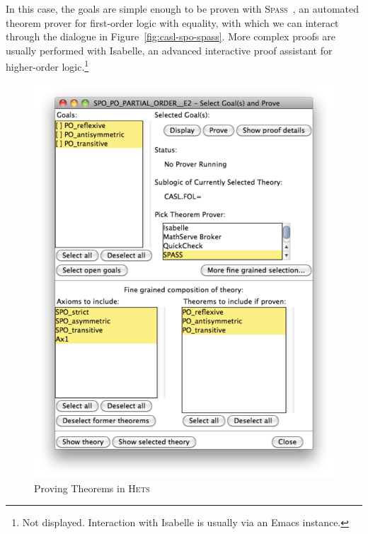 \documentclass[11pt]{article}
\newcommand{\Hets}{\textsc{Hets}}
\newcommand{\Spass}{\textsc{Spass}}
\begin{document}
In this case, the goals are simple enough to be proven with \Spass{}~\cite{Weidenbach:2009}, an automated theorem prover for first-order logic with equality, with which we can interact through the dialogue in Figure~\ref{fig:casl-spo-spass}. More complex proofs are usually performed with Isabelle\cite{Nipkow:2002}, an advanced interactive proof assistant for higher-order logic.\footnote{Not displayed. Interaction with Isabelle is usually via an Emacs instance.}

\begin{figure}
  \begin{minipage}[b]{0.5\textwidth}
    \includegraphics[width=\textwidth]{SPO_prove.pdf}
    \caption{Proving Theorems in \Hets{}}\label{fig:casl-spo-prove}
  \end{minipage}
  \begin{minipage}[b]{0.5\textwidth}

\end{minipage}
\end{figure}
\end{document}
